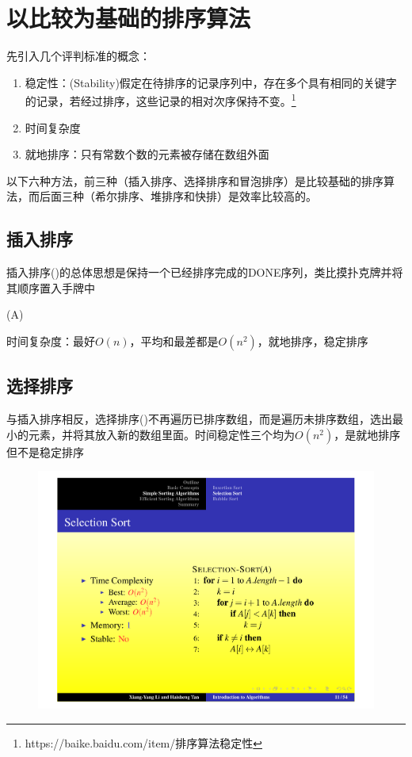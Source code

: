 \documentclass[]{report}
\begin{document}
	\chapter{以比较为基础的排序算法}
	先引入几个评判标准的概念：
	\begin{enumerate}
		\item 稳定性：(Stability)假定在待排序的记录序列中，存在多个具有相同的关键字的记录，若经过排序，这些记录的相对次序保持不变。\footnote{https://baike.baidu.com/item/排序算法稳定性}
		\item 时间复杂度
		\item 就地排序：只有常数个数的元素被存储在数组外面
	\end{enumerate}
	以下六种方法，前三种（插入排序、选择排序和冒泡排序）是比较基础的排序算法，而后面三种（希尔排序、堆排序和快排）是效率比较高的。
	\section{插入排序}
		插入排序({})的总体思想是保持一个已经排序完成的DONE序列，类比摸扑克牌并将其顺序置入手牌中
		\begin{algorithm}
			\caption{{}(A)}
		\end{algorithm}
		时间复杂度：最好$O(n)$，平均和最差都是$O(n^2)$，就地排序，稳定排序
	\section{选择排序}
		与插入排序相反，选择排序({})不再遍历已排序数组，而是遍历未排序数组，选出最小的元素，并将其放入新的数组里面。时间稳定性三个均为$O(n^2)$，是就地排序但不是稳定排序
		\begin{figure}[h!]
			\centering
			\begin{minipage}{40em}
				\centering
				\includegraphics[scale = 0.45]{images/Selection_Sort.pdf}
			\end{minipage}
		\end{figure}
\end{document}

